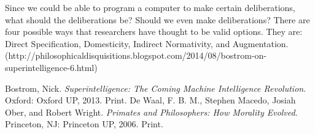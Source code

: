 \documentclass[11pt, oneside]{article}
\begin{document}
\par Since we could be able to program a computer to make certain deliberations, what should the deliberations be? Should we even make deliberations? There are four possible ways that researchers have thought to be valid options. They are: Direct Specification, Domesticity, Indirect Normativity, and Augmentation. (http://philosophicaldisquisitions.blogspot.com/2014/08/bostrom-on-superintelligence-6.html)

\begin{thebibliography}{9}

  Bostrom, Nick. 
  \emph{Superintelligence: The Coming Machine Intelligence Revolution}.
  Oxford: Oxford UP, 2013. 
  Print.
  De Waal, F. B. M., Stephen Macedo, Josiah Ober, and Robert Wright.
  \emph{Primates and Philosophers: How Morality Evolved}.
  Princeton, NJ: Princeton UP, 2006.
  Print.
\end{thebibliography}
\end{document}
